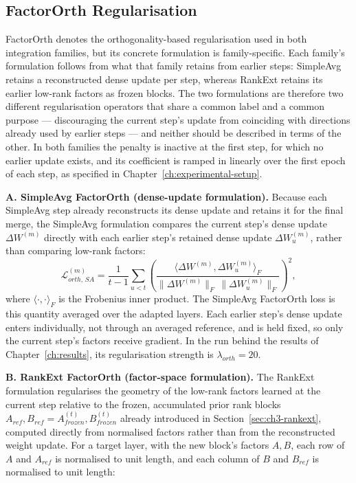 \subsection{FactorOrth Regularisation}
\label{sec:ch3-factororth}

FactorOrth denotes the orthogonality-based regularisation used in both
integration families, but its concrete formulation is family-specific.
Each family's formulation follows from what that family retains from
earlier steps: SimpleAvg retains a reconstructed dense update per step,
whereas RankExt retains its earlier low-rank factors as frozen blocks. The
two formulations are therefore two different regularisation operators that
share a common label and a common purpose --- discouraging the current
step's update from coinciding with directions already used by earlier
steps --- and neither should be described in terms of the other. In both
families the penalty is inactive at the first step, for which no earlier
update exists, and its coefficient is ramped in linearly over the first
epoch of each step, as specified in Chapter~\ref{ch:experimental-setup}.

\textbf{A. SimpleAvg FactorOrth (dense-update formulation).} Because each
SimpleAvg step already reconstructs its dense update and retains it for the
final merge, the SimpleAvg formulation compares the current step's dense
update $\Delta W^{(m)}$ directly with each earlier step's retained dense
update $\Delta W_u^{(m)}$, rather than comparing low-rank factors:
\begin{equation}
\label{eq:ch3-factororth-simpleavg}
\mathcal{L}_{orth,\,SA}^{(m)} = \frac{1}{t-1}\sum_{u<t}
\left(\frac{\langle \Delta W^{(m)}, \Delta W_u^{(m)}\rangle_F}
{\lVert \Delta W^{(m)}\rVert_F \,\lVert \Delta W_u^{(m)}\rVert_F}\right)^{2},
\end{equation}
where $\langle\cdot,\cdot\rangle_F$ is the Frobenius inner product. The
SimpleAvg FactorOrth loss is this quantity averaged over the adapted
layers. Each earlier step's dense update enters individually, not through
an averaged reference, and is held fixed, so only the current step's
factors receive gradient. In the run behind the results of
Chapter~\ref{ch:results}, its regularisation strength is $\lambda_{orth}=20$.

\textbf{B. RankExt FactorOrth (factor-space formulation).} The RankExt
formulation regularises the geometry of the low-rank factors learned at the
current step relative to the frozen, accumulated prior rank blocks
$A_{ref}, B_{ref} = A_{frozen}^{(t)}, B_{frozen}^{(t)}$ already introduced
in Section~\ref{sec:ch3-rankext}, computed directly from normalised factors
rather than from the reconstructed weight update. For a target layer, with
the new block's factors $A, B$, each row of $A$ and $A_{ref}$ is normalised
to unit length, and each column of $B$ and $B_{ref}$ is normalised to unit
length:

